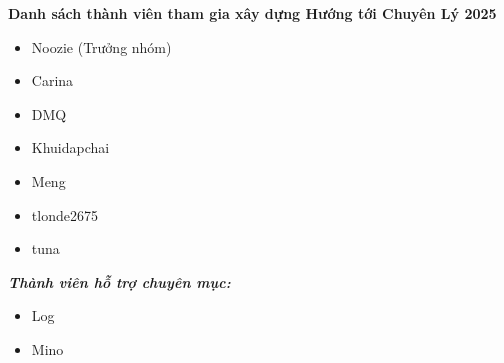{ \normalcolor \textbf{Danh sách thành viên tham gia xây dựng Hướng tới Chuyên Lý 2025}} \\ \vspace{0.5cm}

\begin{itemize}
    \item Noozie {\normalcolor(Trưởng nhóm)}
    \item Carina
    \item DMQ
    \item Khuidapchai
    \item Meng
    \item tlonde2675
    \item tuna
\end{itemize}
\textbf{\textit{Thành viên hỗ trợ chuyên mục:}}
\begin{itemize}
    \item Log
    \item Mino
\end{itemize}


